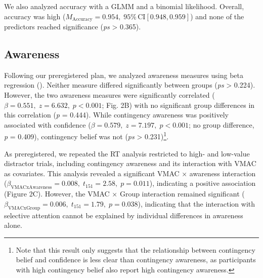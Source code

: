 \documentclass[
  man,
  floatsintext,
  longtable,
  nolmodern,
  notxfonts,
  notimes,
  colorlinks=true,linkcolor=blue,citecolor=blue,urlcolor=blue]{apa7}
\begin{document}
We also analyzed accuracy with a GLMM and a binomial likelihood.
Overall, accuracy was high
(\(M_{\text{Accuracy}} = 0.954, \;95\%\,\text{CI}[0.948, 0.959]\)) and
none of the predictors reached significance (\emph{ps} \textgreater{}
0.365).

\subsection{Awareness}\label{awareness}

Following our preregistered plan, we analyzed awareness measures using
beta regression (). Neither measure differed significantly between groups (\emph{ps}
\textgreater{} 0.224). However, the two awareness measures were
significantly correlated (\(\beta = 0.551, \; z = 6.632, \; p < 0.001\);
Fig. 2B) with no significant group differences in this correlation
(\emph{p} = 0.444). While contingency awareness was positively
associated with confidence
(\(\beta = 0.579, \; z = 7.197, \; p < 0.001\); no group difference,
\emph{p} = 0.409), contingency belief was not (\emph{ps} \textgreater{}
0.231)\footnote{Note that this result only suggests that the
  relationship between contingency belief and confidence is less clear
  than contingency awareness, as participants with high contingency
  belief also report high contingency awareness.}.

As preregistered, we repeated the RT analysis restricted to high- and
low-value distractor trials, including contingency awareness and its
interaction with VMAC as covariates. This analysis revealed a
significant VMAC × awareness interaction
(\(\beta_{\mathrm{VMAC x Awareness}} = 0.008, \; t_{151} = 2.58, \; p = 0.011\)),
indicating a positive association (Figure 2C). However, the VMAC × Group
interaction remained significant
(\(\beta_{\mathrm{VMAC x Group}} = 0.006, \; t_{151} = 1.79, \; p = 0.038\)),
indicating that the interaction with selective attention cannot be
explained by individual differences in awareness alone.
\end{document}
